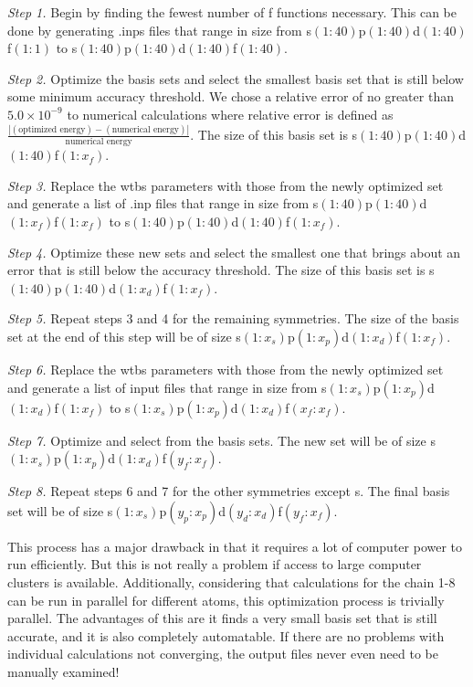 \documentclass[12pt]{report}
\begin{document}
\textit{Step 1.} Begin by finding the fewest number of f functions necessary. This can be done by generating .inps files that range in size from s$(1:40)$p$(1:40)$d$(1:40)$f$(1:1)$ to s$(1:40)$p$(1:40)$d$(1:40)$f$(1:40)$.

\textit{Step 2.} Optimize the basis sets and select the smallest basis set that is still below some minimum accuracy threshold. We chose a relative error of no greater than $5.0\times10^{-9}$ to numerical calculations where relative error is defined as $\frac{|(\text{optimized energy}) - (\text{numerical energy})|}{\text{numerical energy}}$. The size of this basis set is s$(1:40)$p$(1:40)$d$(1:40)$f$(1:x_{f})$.

\textit{Step 3.} Replace the wtbs parameters with those from the newly optimized set and generate a list of .inp files that range in size from s$(1:40)$p$(1:40)$d$(1:x_{f})$f$(1:x_{f})$ to s$(1:40)$p$(1:40)$d$(1:40)$f$(1:x_{f})$.

\textit{Step 4.} Optimize these new sets and select the smallest one that brings about an error that is still below the accuracy threshold. The size of this basis set is s$(1:40)$p$(1:40)$d$(1:x_{d})$f$(1:x_{f})$.

\textit{Step 5.} Repeat steps 3 and 4 for the remaining symmetries. The size of the basis set at the end of this step will be of size s$(1:x_{s})$p$(1:x_{p})$d$(1:x_{d})$f$(1:x_{f})$.

\textit{Step 6.} Replace the wtbs parameters with those from the newly optimized set and generate a list of input files that range in size from s$(1:x_{s})$p$(1:x_{p})$d$(1:x_{d})$f$(1:x_{f})$ to s$(1:x_{s})$p$(1:x_{p})$d$(1:x_{d})$f$(x_{f}:x_{f})$.

\textit{Step 7.} Optimize and select from the basis sets. The new set will be of size s$(1:x_{s})$p$(1:x_{p})$d$(1:x_{d})$f$(y_{f}:x_{f})$.

\textit{Step 8.} Repeat steps 6 and 7 for the other symmetries except s. The final basis set will be of size s$(1:x_{s})$p$(y_{p}:x_{p})$d$(y_{d}:x_{d})$f$(y_{f}:x_{f})$.

This process has a major drawback in that it requires a lot of computer power to run efficiently. But this is not really a problem if access to large computer clusters is available. Additionally, considering that calculations for the chain 1-8 can be run in parallel for different atoms, this optimization process is trivially parallel. The advantages of this are it finds a very small basis set that is still accurate, and it is also completely automatable. If there are no problems with individual calculations not converging, the output files never even need to be manually examined!
\end{document}
